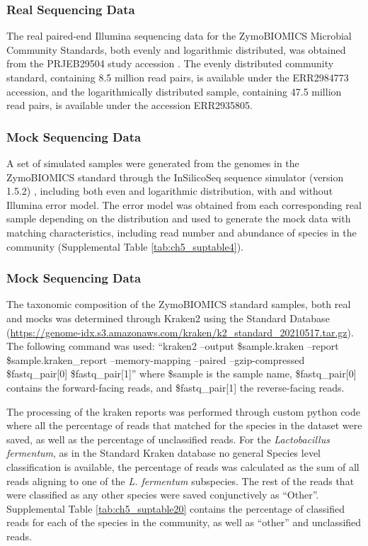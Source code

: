 \subsubsection{Real Sequencing Data}

The real paired-end Illumina sequencing data for the ZymoBIOMICS Microbial Community Standards, both evenly and logarithmic distributed, was obtained from the PRJEB29504 study accession \cite{nicholls_ultra-deep_2019}. The evenly distributed community standard, containing 8.5 million read pairs, is available under the ERR2984773 accession, and the logarithmically distributed sample, containing 47.5 million read pairs, is available under the accession ERR2935805. 

\subsubsection{Mock Sequencing Data}

A set of simulated samples were generated from the genomes in the ZymoBIOMICS standard through the InSilicoSeq sequence simulator (version 1.5.2) \cite{gourle_simulating_2019}, including both even and logarithmic distribution, with and without Illumina error model. The error model was obtained from each corresponding real sample depending on the distribution and used to generate the mock data with matching characteristics, including read number and abundance of species in the community (Supplemental Table \ref{tab:ch5_suptable4}). 

\subsubsection{Mock Sequencing Data}

The taxonomic composition of the ZymoBIOMICS standard samples, both real and mocks was determined through Kraken2 \cite{wood_improved_2019} using the Standard Database (\url{https://genome-idx.s3.amazonaws.com/kraken/k2_standard_20210517.tar.gz}). The following command was used:  “kraken2 --output \$sample.kraken --report \$sample.kraken\_report --memory-mapping --paired --gzip-compressed  \$fastq\_pair[0] \$fastq\_pair[1]” where \$sample is the sample name, \$fastq\_pair[0] contains the forward-facing reads, and \$fastq\_pair[1] the reverse-facing reads.

The processing of the kraken reports was performed through custom python code \cite{noauthor_lmas_2022} where all the percentage of reads that matched for the species in the dataset were saved, as well as the percentage of unclassified reads. For the \textit{Lactobacillus fermentum}, as in the Standard Kraken database no general Species level classification is available, the percentage of reads was calculated as the sum of all reads aligning to one of the \textit{L. fermentum} subspecies. The rest of the reads that were classified as any other species were saved conjunctively as “Other”. Supplemental Table \ref{tab:ch5_suptable20} contains the percentage of classified reads for each of the species in the community, as well as “other” and unclassified reads. 

